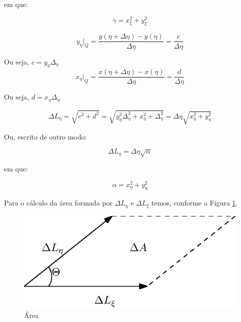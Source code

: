 em que:

\begin{equation}
    \label{eq:3.12}
    \gamma = x_\xi^2 + y_\xi^2
\end{equation}

\begin{equation*}
    y_\eta \vert_Q = \frac{y(\eta+\Delta \eta)-y(\eta)}{\Delta \eta} = \frac{c}{\Delta \eta}
\end{equation*}

Ou seja, $c=y_\eta \Delta_\eta$
\begin{equation*}
    x_\eta \vert_Q = \frac{x(\eta+\Delta \eta)-x(\eta)}{\Delta \eta} = \frac{d}{\Delta \eta}
\end{equation*}

Ou seja, $d=x_\eta \Delta_\eta$

\begin{equation*}
    \Delta L_\eta = \sqrt{c^2+d^2} = \sqrt{y_\eta^2 \Delta_\eta^2 + x_\eta^2+\Delta_\eta^2} = \Delta \eta \sqrt{x_\eta^2 + y_\eta^2}
\end{equation*}

Ou, escrito de outro modo:

\begin{equation}
    \label{eq:3.13}
    \Delta L_\eta = \Delta \eta \sqrt{\alpha}
\end{equation}

em que:

\begin{equation}
    \label{eq:3.14}
    \alpha = x_\eta^2 + y_\eta^2
\end{equation}

Para o cálculo da área formada por $\Delta L_\eta$ e $\Delta L_\xi$ temos, conforme a Figura \ref{fig:area}.

\begin{figure}[]
    \centering
    \includegraphics{fig/area.eps}
    \caption{Área}
    \label{fig:area}
\end{figure}

